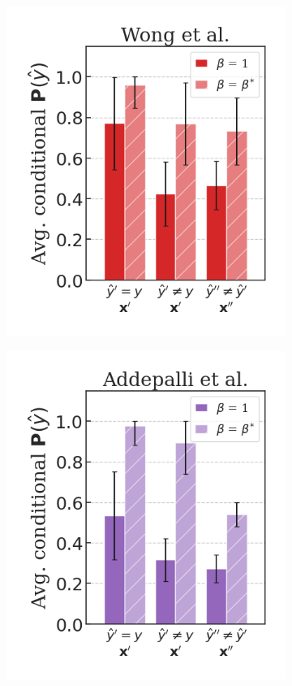\begin{figure}[H]
\begin{subfigure}[b]{0.3\textwidth}
        \includegraphics[width=\textwidth]{img/results_discussion/adversarial/Wong2020Fast_short_FMN_0.png}
    \end{subfigure}
    \begin{subfigure}[b]{0.3\textwidth}
        \centering
        \includegraphics[width=\textwidth]{img/results_discussion/adversarial/Addepalli2021Towards_RN18_short_PGD_0.0314_0.png}
    \end{subfigure}
   

\end{figure}
